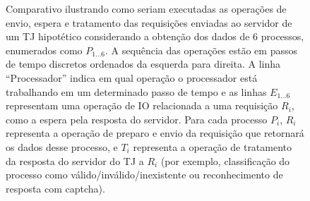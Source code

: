 \begin{figure}[H]

    \caption{%
        Comparativo ilustrando como seriam executadas as operações de envio,
        espera e tratamento das requisições enviadas ao servidor de um TJ
        hipotético considerando a obtenção dos dados de 6 processos, enumerados
        como $P_{1...6}$. A sequência das operações estão em passos de tempo
        discretos ordenados da esquerda para direita. A linha ``Processador''
        indica em qual operação o processador está trabalhando em um
        determinado passo de tempo e as linhas $E_{1...6}$ representam uma
        operação de IO relacionada a uma requisição $R_i$, como a espera pela
        resposta do servidor.
        Para cada processo $P_i$, $R_i$ representa a operação de preparo e
        envio da requisição que retornará os dados desse processo, e $T_i$
        representa a operação de tratamento da resposta do servidor do TJ a
        $R_i$ (por exemplo, classificação do processo como
        válido/inválido/inexistente ou reconhecimento de resposta com captcha).
    }
    \label{gra:modelo-temporização-requisições}
\end{figure}

